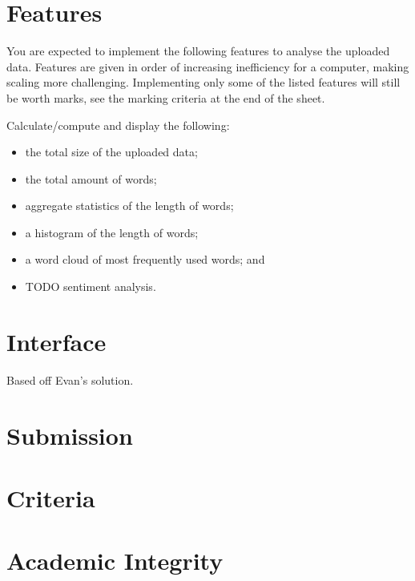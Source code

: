 \documentclass{csse4400}
\begin{document}
\section{Features}
You are expected to implement the following features to analyse the uploaded data.
Features are given in order of increasing inefficiency for a computer,
making scaling more challenging.
Implementing only some of the listed features will still be worth marks, see the marking criteria at the end of the sheet.

Calculate/compute and display the following:
\begin{itemize}
    \item the total size of the uploaded data;
    \item the total amount of words;
    \item aggregate statistics of the length of words;
    \item a histogram of the length of words;
    \item a word cloud of most frequently used words; and
    \item TODO sentiment analysis.
\end{itemize}

\section{Interface}
Based off Evan's solution.

\section{Submission}

\section{Criteria}

\section{Academic Integrity}



\end{document}
